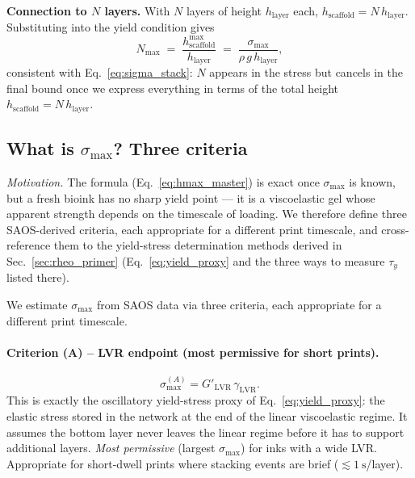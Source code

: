 \documentclass[11pt,a4paper]{article}
\begin{document}
\begin{derivationbox}[title={DERIVATION --- Self-weight force balance
for $h_\mathrm{scaffold}^{\max}$}]
\medskip\noindent\textbf{Connection to $N$ layers.}
With $N$ layers of height $h_\mathrm{layer}$ each,
$h_\mathrm{scaffold}=N\,h_\mathrm{layer}$.  Substituting into the yield
condition gives
\begin{equation}
N_\mathrm{max}
\;=\; \frac{h_\mathrm{scaffold}^{\max}}{h_\mathrm{layer}}
\;=\; \frac{\sigma_\mathrm{max}}{\rho\,g\,h_\mathrm{layer}},
\end{equation}
consistent with Eq.~\eqref{eq:sigma_stack}: $N$ appears in the stress
but cancels in the final bound once we express everything in terms of
the total height $h_\mathrm{scaffold}=N\,h_\mathrm{layer}$.
\end{derivationbox}

\subsection{What is $\sigma_\mathrm{max}$? Three criteria}
\label{sec:three_criteria}

\emph{Motivation.}
The formula (Eq.~\ref{eq:hmax_master}) is exact once $\sigma_\mathrm{max}$
is known, but a fresh bioink has no sharp yield point --- it is a
viscoelastic gel whose apparent strength depends on the timescale of
loading.  We therefore define three SAOS-derived criteria, each
appropriate for a different print timescale, and cross-reference them to
the yield-stress determination methods derived in
Sec.~\ref{sec:rheo_primer} (Eq.~\ref{eq:yield_proxy} and the three ways
to measure $\tau_y$ listed there).

We estimate $\sigma_\mathrm{max}$ from SAOS data via three criteria,
each appropriate for a different print timescale.

\paragraph{Criterion (A) -- LVR endpoint (most permissive for short prints).}
\begin{equation}
\sigma_\mathrm{max}^{(A)} = G'_\mathrm{LVR}\,\gamma_\mathrm{LVR}.
\label{eq:sigmaA}
\end{equation}
This is exactly the oscillatory yield-stress proxy of
Eq.~\eqref{eq:yield_proxy}: the elastic stress stored in the network at
the end of the linear viscoelastic regime.  It assumes the bottom layer
never leaves the linear regime before it has to support additional
layers.  \emph{Most permissive} (largest $\sigma_\mathrm{max}$) for
inks with a wide LVR.  Appropriate for short-dwell prints where stacking
events are brief ($\lesssim\SI{1}{\s}$/layer).
\end{document}

